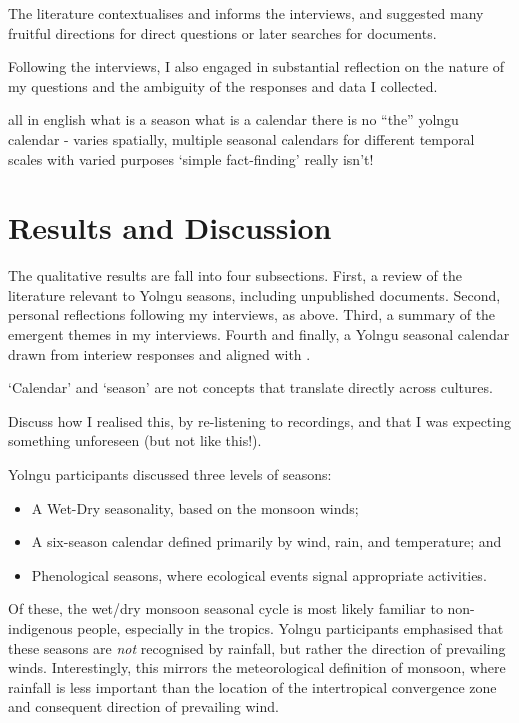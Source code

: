 The literature contextualises and informs the interviews, and suggested many fruitful
directions for direct questions or later searches for documents.


Following the interviews, I also engaged in substantial reflection on the nature of
my questions and the ambiguity of the responses and data I collected.

all in english
what is a season
what is a calendar
there is no ``the'' yolngu calendar - varies spatially, multiple seasonal calendars for different temporal scales with varied purposes
`simple fact-finding' really isn't!



\section{Results and Discussion}

The qualitative results are fall into four subsections.
First, a review of the literature relevant to Yolngu seasons, including unpublished documents.
Second, personal reflections following my interviews, as above.
Third, a summary of the emergent themes in my interviews.
Fourth and finally, a Yolngu seasonal calendar drawn from interiew responses and aligned with \citet{davis1989}.




`Calendar' and `season' are not concepts that translate directly across cultures. 

Discuss how I realised this, by re-listening to recordings, and that I was expecting something unforeseen (but not like this!).  

Yolngu participants discussed three levels of seasons:
\begin{itemize}
\item A Wet-Dry seasonality, based on the monsoon winds;
\item A six-season calendar defined primarily by wind, rain, and temperature; and
\item Phenological seasons, where ecological events signal appropriate activities.
\end{itemize}

Of these, the wet/dry monsoon seasonal cycle is most likely familiar to non-indigenous people,
especially in the tropics.  Yolngu participants emphasised that these seasons
are \textit{not} recognised by rainfall, but rather the direction of prevailing winds.
Interestingly, this mirrors the meteorological definition of monsoon, where rainfall is less important than
the location of the intertropical convergence zone and consequent direction of prevailing wind.




